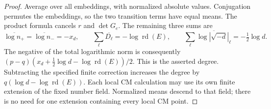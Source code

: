 \begin{proof}
Average over all embeddings, with normalized absolute values.
Conjugation permutes the embeddings, so the two transition terms
have equal means. The product formula cancels $r$ and $\det G_e$.
The remaining three sums are
\[
 \overline{\log n_+}=\overline{\log n_-}=-x_d,\qquad
 \sum_\ell\overline{D_\ell}=-\log\operatorname{rd}(E),\qquad
 \sum_\ell\overline{\log|\sqrt{-d}|_\ell}=-\tfrac12\log d.
\]
The negative of the total logarithmic norm is consequently
$(p-q)(x_d+\tfrac12\log d-\log\operatorname{rd}(E))/2$.
This is the asserted degree. Subtracting the specified finite
correction increases the degree by
$q(\log d-\log\operatorname{rd}(E))$.
Each local CM calculation may use its own finite extension of
the fixed number field. Normalized means descend to that field;
there is no need for one extension containing every local CM point.
\end{proof}
